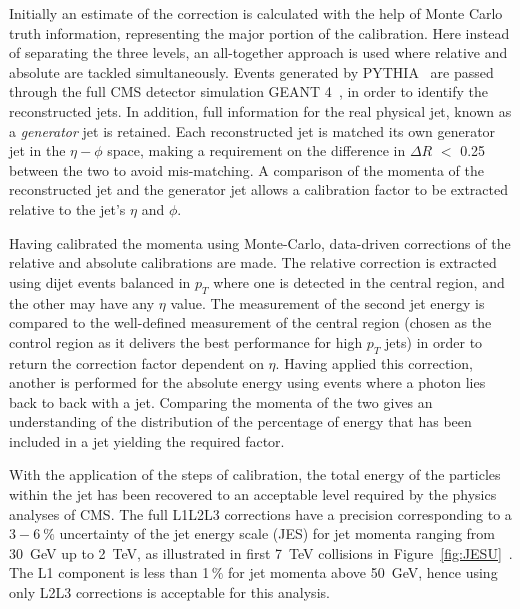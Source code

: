 Initially an estimate of the correction is calculated with the help of Monte Carlo truth information, representing the major portion of the calibration. Here instead of separating the three levels, an all-together approach is used where relative and absolute are tackled simultaneously. Events generated by \textsc{PYTHIA}~\cite{pythia} are passed through the full CMS detector simulation \textsc{GEANT 4}~\cite{GEANT4}, in order to identify the reconstructed jets. In addition, full information for the real physical jet, known as a \textit{generator} jet is retained. Each reconstructed jet is matched its own generator jet in the $\eta - \phi$ space, making a requirement on the difference in $\Delta R$ $<$ 0.25 between the two to avoid mis-matching. A comparison of the momenta of the reconstructed jet and the generator jet allows a calibration factor to be extracted relative to the jet's $\eta$ and $\phi$. 

Having calibrated the momenta using Monte-Carlo, data-driven corrections of the relative and absolute calibrations are made. The relative correction is extracted using dijet events balanced in $p_{T}$ where one is detected in the central region, and the other may have any $\eta$ value. The measurement of the second jet energy is compared to the well-defined measurement of the central region (chosen as the control region as it delivers the best performance for high $p_{T}$ jets) in order to return the correction factor dependent on $\eta$.  Having applied this correction, another is performed for the absolute energy using events where a photon lies back to back with a jet. Comparing the momenta of the two gives an understanding of the distribution of the percentage of energy that has been included in a jet yielding the required factor.

With the application of the steps of calibration, the total energy of the particles within the jet has been recovered to an acceptable level required by the physics analyses of CMS. The full L1L2L3 corrections have a precision corresponding to a $3 - 6~\%$ uncertainty of the jet energy scale (JES) for jet momenta ranging from 30~GeV up to 2~TeV, as illustrated in first 7~TeV collisions in Figure~\ref{fig:JESU}~\cite{JME-10-010}. The L1 component is less than 1\,$\%$ for jet momenta above 50~GeV, hence using only L2L3 corrections is acceptable for this analysis. 


